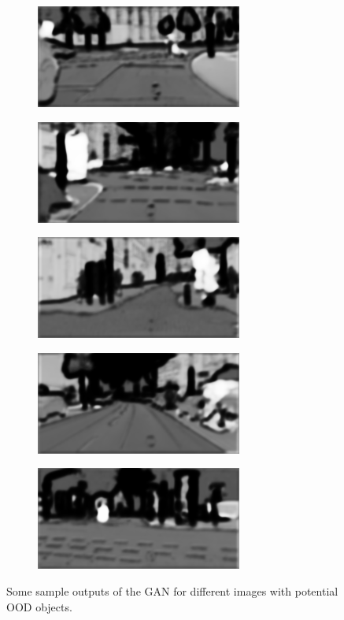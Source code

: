 \begin{figure}[b]
	\centering
	\begin{subfigure}{.5\textwidth}
		\centering
		\includegraphics{Sources/Results/no_pooling/novelty_maps/novelty_map_1.png}
	\end{subfigure}%
	\begin{subfigure}{.5\textwidth}
		\centering
		\includegraphics{Sources/Results/no_pooling/novelty_maps/novelty_map_2.png}
	\end{subfigure}
	\begin{subfigure}{.5\textwidth}
		\centering
		\includegraphics{Sources/Results/no_pooling/novelty_maps/novelty_map_3.png}
	\end{subfigure}%
	\begin{subfigure}{.5\textwidth}
		\centering
		\includegraphics{Sources/Results/no_pooling/novelty_maps/novelty_map_4.png}
	\end{subfigure}
	\begin{subfigure}{.5\textwidth}
		\raggedleft
		\includegraphics{Sources/Results/no_pooling/novelty_maps/novelty_map_5.png}
	\end{subfigure}
	\caption[short]{Some sample outputs of the GAN for different images with potential OOD objects.} \label{fig:novelty_maps_no_pooling}
\end{figure}

